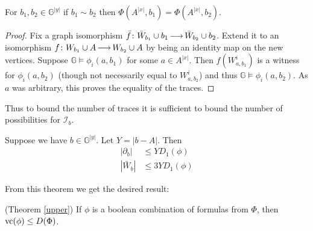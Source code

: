 \documentclass{amsart}
\newcommand{\II}{\mathscr I}
\newcommand{\GG}{\mathbb G}
\newcommand{\GGY}{\GG^{|y|}}
\newcommand{\AX}{A^{|x|}}
\newcommand{\abs}[1]{\left|#1\right|}
\begin{document}
\begin{Lemma} \label {bound_trace}
  For $b_1, b_2 \in \GGY$ if $b_1 \sim b_2$ then $\Phi(\AX, b_1) = \Phi(\AX, b_2)$.
\end{Lemma}

\begin{proof}
  Fix a graph isomorphism $\bar f \colon \bar W_{b_1} \cup b_1 \operatorname{\longrightarrow} \bar W_{b_2} \cup b_2$.
  Extend it to an isomorphism $f \colon W_{b_1} \cup A \operatorname{\longrightarrow} W_{b_2} \cup A$ by being an identity map on the new vertices.
  Suppose $\GG \models \phi_i(a, b_1)$ for some $a \in \AX$.
  Then $f(W^i_{a, b_1})$ is a witness for  $\phi_i(a, b_2)$ (though not necessarily equal to $W^i_{a, b_2}$)
  and thus $\GG \models \phi_i(a, b_2)$.
  As $a$ was arbitrary, this proves the equality of the traces.
\end{proof}

Thus to bound the number of traces it is sufficient to bound the number of possibilities for $\II_b$.

\begin{Theorem} \label{main_bound}
  Suppose we have $b \in \GGY$.
  Let $Y = \abs{b - A}$.
  Then
  \begin{align*}
    |\partial_b| &\leq Y D_1(\phi) \\ 
    |\bar W_b| &\leq 3 Y D_1(\phi)
  \end{align*}
\end{Theorem}

From this theorem we get the desired result:
\begin{Corollary} (Theorem \ref{upper})
  If $\phi$ is a boolean combination of formulas from $\Phi$, then $\operatorname{vc}(\phi) \leq D(\Phi)$.
\end{Corollary}
\end{document}
